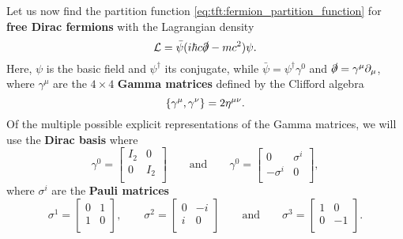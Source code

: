 Let us now find the partition function \eqref{eq:tft:fermion_partition_function} for \textbf{free Dirac fermions} with the Lagrangian density
\begin{equation}
	\mathcal{L} = \bar\psi (i \hbar c \slashed\partial - m c^2) \psi .
\label{eq:tft:dirac_lagrangian}
\end{equation}
Here, $\psi$ is the basic field and $\psi^\dagger$ its conjugate, while $\bar\psi = \psi^\dagger \gamma^0$ and $\slashed\partial = \gamma^\mu \partial_\mu$, where $\gamma^\mu$ are the $4 \times 4$ \textbf{Gamma matrices} defined by the Clifford algebra
\begin{equation}
	\{ \gamma^\mu , \gamma^\nu \} = 2 \eta^{\mu \nu} .
\end{equation}
Of the multiple possible explicit representations of the Gamma matrices, we will use the \textbf{Dirac basis} where
\begin{equation}
	\gamma^0 = \begin{bmatrix} I_2 & 0 \\ 0 & I_2 \\ \end{bmatrix}
	\qquad \text{and} \qquad
	\gamma^0 = \begin{bmatrix} 0 & \sigma^i \\ -\sigma^i & 0 \\ \end{bmatrix} ,
\label{eq:tft:gamma_dirac_basis}
\end{equation}
where $\sigma^i$ are the \textbf{Pauli matrices}
\begin{equation}
	\sigma^1 = \begin{bmatrix} 0 & 1 \\ 1 & 0 \\ \end{bmatrix} ,
	\qquad
	\sigma^2 = \begin{bmatrix} 0 & -i \\ i & 0 \\ \end{bmatrix}
	\qquad \text{and} \qquad
	\sigma^3 = \begin{bmatrix} 1 & 0 \\ 0 & -1 \\ \end{bmatrix} .
\end{equation}


